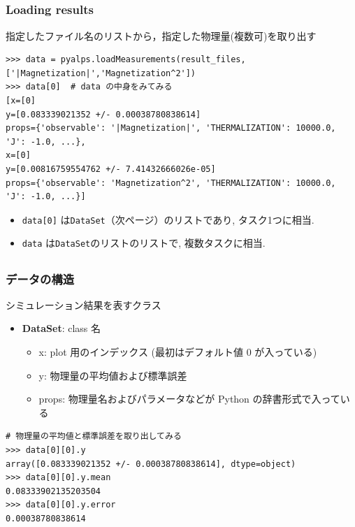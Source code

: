 \subsection*{\redm\whiteb\greenb}
\begin{frame}[t,fragile]
\frametitle{Loading results}
指定したファイル名のリストから，指定した物理量(複数可)を取り出す
\begin{lstlisting}
>>> data = pyalps.loadMeasurements(result_files,['|Magnetization|','Magnetization^2'])
>>> data[0]  # data の中身をみてみる
[x=[0]
y=[0.083339021352 +/- 0.00038780838614]
props={'observable': '|Magnetization|', 'THERMALIZATION': 10000.0, 'J': -1.0, ...}, 
x=[0]
y=[0.00816759554762 +/- 7.41432666026e-05]
props={'observable': 'Magnetization^2', 'THERMALIZATION': 10000.0, 'J': -1.0, ...}]
\end{lstlisting}
  \begin{itemize}
    \item \verb|data[0]| は\verb|DataSet|（次ページ）のリストであり, タスク1つに相当.
    \item \verb|data| は\verb|DataSet|のリストのリストで, 複数タスクに相当.
  \end{itemize}

\end{frame}

\subsection*{\redm\whiteb\greenb}
\begin{frame}[t,fragile]
\frametitle{データの構造}
シミュレーション結果を表すクラス
\begin{itemize}
\item \textbf{DataSet}: class 名
  \begin{itemize}
  \item x: plot 用のインデックス (最初はデフォルト値 0 が入っている)
  \item y: 物理量の平均値および標準誤差
  \item props: 物理量名およびパラメータなどが Python の辞書形式で入っている
  \end{itemize}
\end{itemize}

\begin{lstlisting}
# 物理量の平均値と標準誤差を取り出してみる
>>> data[0][0].y
array([0.083339021352 +/- 0.00038780838614], dtype=object)
>>> data[0][0].y.mean
0.08333902135203504
>>> data[0][0].y.error
0.00038780838614
\end{lstlisting}
\end{frame}

